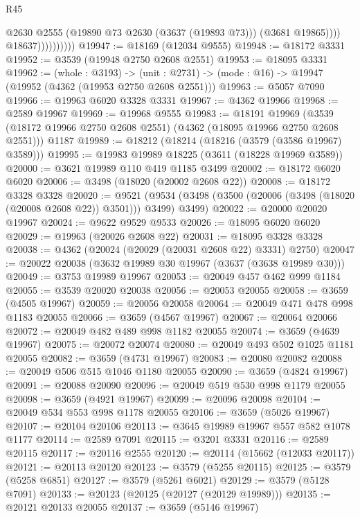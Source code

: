 \begin{lexlean}{R45}
\begin{coremodule}
                              @2630
                              @2555
                              (@19890 @73 @2630 (@3637 (@19893 @73)))
                              (@3681 @19865))))
                        @18637))))))))))
@19947 := @18169 (@12034 @9555)
@19948 := @18172 @3331
@19952 := @3539 (@19948 @2750 @2608 @2551)
@19953 := @18095 @3331
@19962 := (whole : @3193) ->
  (unit : @2731) -> (mode : @16) -> @19947 (@19952 (@4362 (@19953 @2750 @2608 @2551)))
@19963 := @5057 @7090
@19966 := @19963 @6020 @3328 @3331
@19967 := @4362 @19966
@19968 := @2589 @19967
@19969 := @19968 @9555
@19983 := @18191
    @19969
    (@3539 (@18172 @19966 @2750 @2608 @2551) (@4362 (@18095 @19966 @2750 @2608 @2551)))
    @1187
@19989 := @18212 (@18214 (@18216 (@3579 (@3586 @19967) @3589)))
@19995 := @19983 @19989 @18225 (@3611 (@18228 @19969 @3589))
@20000 := @3621 @19989 @110 @419 @1185 @3499
@20002 := @18172 @6020 @6020
@20006 := @3498 (@18020 (@20002 @2608 @22))
@20008 := @18172 @3328 @3328
@20020 := @9521
    (@9534 (@3498 (@3500 (@20006 (@3498 (@18020 (@20008 @2608 @22)) @3501))) @3499) @3499)
@20022 := @20000 @20020 @19967
@20024 := @9622 @9529 @9533
@20026 := @18095 @6020 @6020
@20029 := @19963 (@20026 @2608 @22)
@20031 := @18095 @3328 @3328
@20038 := @4362 (@20024 (@20029 (@20031 @2608 @22) @3331) @2750)
@20047 := @20022 @20038 (@3632 @19989 @30 @19967 (@3637 (@3638 @19989 @30)))
@20049 := @3753 @19989 @19967
@20053 := @20049 @457 @462 @999 @1184
@20055 := @3539 @20020 @20038
@20056 := @20053 @20055
@20058 := @3659 (@4505 @19967)
@20059 := @20056 @20058
@20064 := @20049 @471 @478 @998 @1183 @20055
@20066 := @3659 (@4567 @19967)
@20067 := @20064 @20066
@20072 := @20049 @482 @489 @998 @1182 @20055
@20074 := @3659 (@4639 @19967)
@20075 := @20072 @20074
@20080 := @20049 @493 @502 @1025 @1181 @20055
@20082 := @3659 (@4731 @19967)
@20083 := @20080 @20082
@20088 := @20049 @506 @515 @1046 @1180 @20055
@20090 := @3659 (@4824 @19967)
@20091 := @20088 @20090
@20096 := @20049 @519 @530 @998 @1179 @20055
@20098 := @3659 (@4921 @19967)
@20099 := @20096 @20098
@20104 := @20049 @534 @553 @998 @1178 @20055
@20106 := @3659 (@5026 @19967)
@20107 := @20104 @20106
@20113 := @3645 @19989 @19967 @557 @582 @1078 @1177
@20114 := @2589 @7091
@20115 := @3201 @3331
@20116 := @2589 @20115
@20117 := @20116 @2555
@20120 := @20114 (@15662 (@12033 @20117))
@20121 := @20113 @20120
@20123 := @3579 (@5255 @20115)
@20125 := @3579 (@5258 @6851)
@20127 := @3579 (@5261 @6021)
@20129 := @3579 (@5128 @7091)
@20133 := @20123 (@20125 (@20127 (@20129 @19989)))
@20135 := @20121 @20133 @20055
@20137 := @3659 (@5146 @19967)

\end{coremodule}
\end{lexlean}
